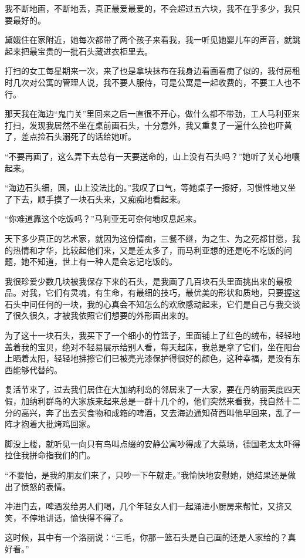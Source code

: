 \par 我不断地画，不断地丢，真正最爱最爱的，不会超过五六块，我不在乎多少，我只要最好的。
\par 黛娥住在家附近，她每次都带了两个孩子来看我，我一听见她婴儿车的声音，就跳起来把最宝贵的一批石头藏进衣柜里去。
\par 打扫的女工每星期来一次，来了也是拿块抹布在我身边看画看痴了似的，我付房租时几次对公寓的管理人说，我不要人服侍，可是公寓是一起收费的，不要工人也不行。
\par 那天我在海边“鬼门关”里回来之后一直很不开心，做什么都不带劲，工人马利亚来打扫，发现我居然不坐在桌前画石头，十分意外，我又重复了一遍什么脸也吓黄了，差点捡石头溺死了的话给她听。
\par “不要再画了，这么弄下去总有一天要送命的，山上没有石头吗？”她听了关心地嚷起来。
\par “海边石头细，圆，山上没法比的。”我叹了口气，等她桌子一擦好，习惯性地又坐了下去，顺手摸了一块石头来，又痴痴地看起来。
\par “你难道靠这个吃饭吗？”马利亚无可奈何地叹息起来。
\par 天下多少真正的艺术家，就因为这份情痴，三餐不继，为之生、为之死都甘愿，我的热情和才华，比较起他们来，又是差太多了，而马利亚想的还是吃不吃饭的问题，她不知道，世上有一种人是会忘记吃饭的。
\par 我很珍爱少数几块被我保存下来的石头，是我画了几百块石头里面挑出来的最极品。对我，它们有灵魂，有生命，有最细的技巧，最优美的形状和质地，只要握这石头中间任何的一块，我的心真会不知怎么的欢欣感动起来，它们是自己与我交谈了很久很久，才被我依照它们想要的外形画出来的。
\par 为了这十一块石头，我买下了一个细小的竹篮子，里面铺上了红色的绒布，轻轻地盖着我的宝贝，绝对不轻易展示给别人看，每天起床，我总是拿了它们，坐在阳台上晒着太阳，轻轻地拂擦它们已被亮光漆保护得很好的颜色，这种幸福，是没有东西能够代替的。
\par 复活节来了，过去我们居住在大加纳利岛的邻居来了一大家，要在丹纳丽芙度四天假，加纳利群岛的大家族来起来总是一群十几个的，他们突然来看我，我自然十二分的高兴，奔了出去买食物和成箱的啤酒，又去海边通知荷西叫他早回来，乱了一阵才抱着大批烤鸡回家。
\par 脚没上楼，就听见一向只有鸟叫点缀的安静公寓吵得成了大菜场，德国老太太吓得拉住我拼命指我们的门。
\par “不要怕，是我的朋友们来了，只吵一下午就走。”我愉快地安慰她，她结果还是做出了愤怒的表情。
\par 冲进门去，啤酒发给男人们喝，几个年轻女人们一起涌进小厨房来帮忙，又挤又笑，不停地讲话，愉快得不得了。
\par 这时候，其中有一个洛丽说：“三毛，你那一篮石头是自己画的还是人家给的？真好看。”
